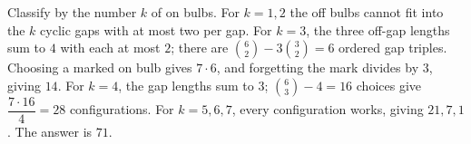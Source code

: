 Classify by the number $k$ of on bulbs. For $k=1,2$ the off bulbs cannot fit into the $k$ cyclic gaps with at most two per gap. For $k=3$, the three off-gap lengths sum to $4$ with each at most $2$; there are $\binom62-3\binom32=6$ ordered gap triples. Choosing a marked on bulb gives $7\cdot6$, and forgetting the mark divides by $3$, giving $14$. For $k=4$, the gap lengths sum to $3$; $\binom63-4=16$ choices give $\dfrac{7\cdot16}{4}=28$ configurations. For $k=5,6,7$, every configuration works, giving $21,7,1$. The answer is $\boxed{71}$.
